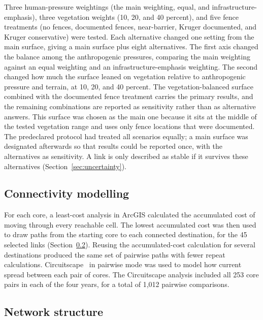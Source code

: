 Three human-pressure weightings (the main weighting, equal, and infrastructure-emphasis), three vegetation weights (10, 20, and 40 percent), and five fence treatments (no fences, documented fences, near-barrier, Kruger documented, and Kruger conservative) were tested. Each alternative changed one setting from the main surface, giving a main surface plus eight alternatives. The first axis changed the balance among the anthropogenic pressures, comparing the main weighting against an equal weighting and an infrastructure-emphasis weighting. The second changed how much the surface leaned on vegetation relative to anthropogenic pressure and terrain, at 10, 20, and 40 percent. The vegetation-balanced surface combined with the documented fence treatment carries the primary results, and the remaining combinations are reported as sensitivity rather than as alternative answers. This surface was chosen as the main one because it sits at the middle of the tested vegetation range and uses only fence locations that were documented. The predeclared protocol had treated all scenarios equally; a main surface was designated afterwards so that results could be reported once, with the alternatives as sensitivity. A link is only described as stable if it survives these alternatives (Section~\ref{sec:uncertainty}).

\subsection{Connectivity modelling}
\label{sec:connectivity}

For each core, a least-cost analysis in ArcGIS calculated the accumulated cost of moving through every reachable cell. The lowest accumulated cost was then used to draw paths from the starting core to each connected destination, for the 45 selected links (Section~\ref{sec:graph}). Reusing the accumulated-cost calculation for several destinations produced the same set of pairwise paths with fewer repeat calculations. Circuitscape \circuitscapeversion\ in pairwise mode \parencite{anantharaman2020circuitscape} was used to model how current spread between each pair of cores. The Circuitscape analysis included all 253 core pairs in each of the four years, for a total of 1,012 pairwise comparisons.

\subsection{Network structure}
\label{sec:graph}

